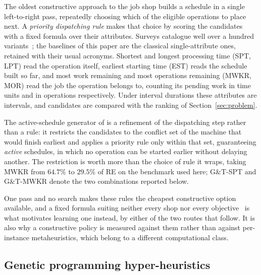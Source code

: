 \documentclass[preprint,authoryear,12pt]{elsarticle}
\theoremstyle{definition}
\theoremstyle{remark}
\begin{document}
The oldest constructive approach to the job shop builds a schedule in
a single left-to-right pass, repeatedly choosing which of the eligible
operations to place next. A \emph{priority dispatching rule} makes
that choice by scoring the candidates with a fixed formula over their
attributes. Surveys catalogue well over a hundred
variants~\citep{Panwalkar1977,Haupt1989,Durasevic2018}; the baselines
of this paper are the classical single-attribute ones, retained with
their usual acronyms. Shortest and longest processing time (SPT, LPT)
read the operation itself, earliest starting time (EST) reads the
schedule built so far, and most work remaining and most operations
remaining (MWKR, MOR) read the job the operation belongs to, counting
its pending work in time units and in operations respectively. Under
interval durations these attributes are intervals, and candidates are
compared with the ranking of Section~\ref{sec:problem}.

The active-schedule generator of \citet{GifflerThompson1960} is a
refinement of the dispatching step rather than a rule: it restricts
the candidates to the conflict set of the machine that would finish
earliest and applies a priority rule only within that set,
guaranteeing \emph{active} schedules, in which no operation can be
started earlier without delaying another. The restriction is worth
more than the choice of rule it wraps, taking MWKR from $64.7\%$ to
$29.5\%$ of RE on the benchmark used here; G\&T-SPT and G\&T-MWKR
denote the two combinations reported below.

One pass and no search makes these rules the cheapest constructive
option available, and a fixed formula suiting neither every shop nor
every objective~\citep{Haupt1989} is what motivates learning one
instead, by either of the two routes that follow. It is also why a
constructive policy is measured against them rather than against
per-instance metaheuristics, which belong to a different
computational class.

\subsection{Genetic programming hyper-heuristics}
\label{sec:related-gp}
\end{document}
